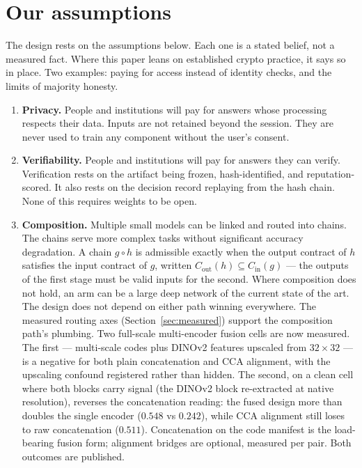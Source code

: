 \documentclass[11pt]{article}
\begin{document}
\section{Our assumptions}\label{sec:assumptions}

The design rests on the assumptions below. Each one is a stated
belief, not a measured fact. Where this paper leans on established
crypto practice, it says so in place. Two examples: paying for
access instead of identity checks, and the limits of majority
honesty.

\begin{enumerate}
\item \textbf{Privacy.} People and institutions will pay for
answers whose processing respects their data. Inputs are not
retained beyond the session. They are never used to train any
component without the user's consent.
\item \textbf{Verifiability.} People and institutions will pay for
answers they can verify. Verification rests on the artifact being
frozen, hash-identified, and reputation-scored. It also rests on
the decision record replaying from the hash chain. None of this
requires weights to be open.
\item \textbf{Composition.} Multiple small models can be linked
and routed into chains. The chains serve more complex tasks
without significant accuracy degradation. A chain $g \circ h$ is
admissible exactly when the output contract of $h$ satisfies the
input contract of $g$, written
$C_{\mathrm{out}}(h) \subseteq C_{\mathrm{in}}(g)$ --- the
outputs of the first stage must be valid inputs for the second.
Where composition does not hold, an arm can be a large deep
network of
the current state of the art. The design does not depend on
either path winning everywhere. The measured routing axes
(Section~\ref{sec:measured}) support the composition path's
plumbing. Two full-scale multi-encoder fusion cells are now
measured. The first --- multi-scale codes plus DINOv2 features
upscaled from $32\times32$ --- is a negative for both plain
concatenation and CCA alignment, with the upscaling confound
registered rather than hidden. The second, on a clean cell where
both blocks carry signal (the DINOv2 block re-extracted at native
resolution), reverses the concatenation reading: the fused design
more than doubles the single encoder ($0.548$ vs $0.242$), while
CCA alignment still loses to raw concatenation ($0.511$).
Concatenation on the code manifest is the load-bearing fusion
form; alignment bridges are optional, measured per pair. Both
outcomes are published.
\end{enumerate}
\end{document}
